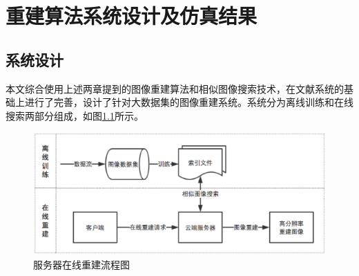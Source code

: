 \chapter{重建算法系统设计及仿真结果}



\section{系统设计}

本文综合使用上述两章提到的图像重建算法和相似图像搜索技术，在文献\cite{Yue:2013gl}系统的基础上进行了完善，设计了针对大数据集的图像重建系统。系统分为离线训练和在线搜索两部分组成，如图\ref{fig:system}所示。

\begin{figure}
\centering\includegraphics[width=15cm]{imgs/ch4/system}
\caption{服务器在线重建流程图}
\label{fig:system}
\end{figure}

